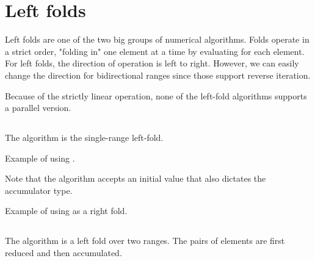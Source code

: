 \section{Left folds}

Left folds are one of the two big groups of numerical algorithms. Folds operate in a strict order, "folding in" one element at a time by evaluating  for each element. For left folds, the direction of operation is left to right. However, we can easily change the direction for bidirectional ranges since those support reverse iteration.

Because of the strictly linear operation, none of the left-fold algorithms supports a parallel version.

\subsection{\texorpdfstring{}{\texttt{std::accumulate}}}

The  algorithm is the single-range left-fold.


\begin{box-note}
\footnotesize Example of using .
\tcblower
{}
\end{box-note}

Note that the algorithm accepts an initial value that also dictates the accumulator type.

\begin{box-note}
\footnotesize Example of using  as a right fold.
\tcblower
{}
\end{box-note}

\subsection{\texorpdfstring{}{\texttt{std::inner\_product}}}

The  algorithm is a left fold over two ranges. The pairs of elements are first reduced and then accumulated.

